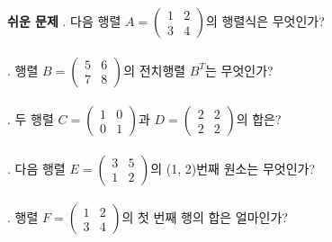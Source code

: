 \documentclass[fleqn]{article}
\begin{document}
      
        \textbf{쉬운 문제}  
. 다음 행렬 \( A = \begin{pmatrix} 1 & 2 \\ 3 & 4 \end{pmatrix} \)의 행렬식은 무엇인가?  
\\\\  
. 행렬 \( B = \begin{pmatrix} 5 & 6 \\ 7 & 8 \end{pmatrix} \)의 전치행렬 \( B^T \)는 무엇인가?  
\\\\  
. 두 행렬 \( C = \begin{pmatrix} 1 & 0 \\ 0 & 1 \end{pmatrix} \)과 \( D = \begin{pmatrix} 2 & 2 \\ 2 & 2 \end{pmatrix} \)의 합은?  
\\\\  
. 다음 행렬 \( E = \begin{pmatrix} 3 & 5 \\ 1 & 2 \end{pmatrix} \)의 (1, 2)번째 원소는 무엇인가?  
\\\\  
. 행렬 \( F = \begin{pmatrix} 1 & 2 \\ 3 & 4 \end{pmatrix} \)의 첫 번째 행의 합은 얼마인가?  
\\\\  
\end{document}
